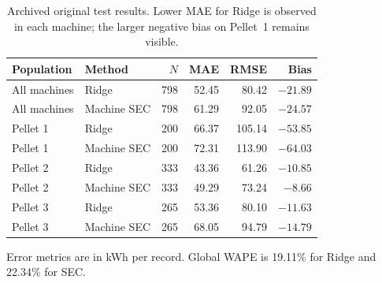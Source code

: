 \begin{table}[!htbp]\centering\small
\caption{Archived original test results. Lower MAE for Ridge is observed in each machine; the larger negative bias on Pellet~1 remains visible.}\label{tab:test}
\begin{tabular}{@{}llrrrr@{}}\toprule
Population & Method & $N$ & MAE & RMSE & Bias\\\midrule
All machines & Ridge & 798 & 52.45 & 80.42 & $-21.89$\\
All machines & Machine SEC & 798 & 61.29 & 92.05 & $-24.57$\\\addlinespace
Pellet 1 & Ridge & 200 & 66.37 & 105.14 & $-53.85$\\
Pellet 1 & Machine SEC & 200 & 72.31 & 113.90 & $-64.03$\\
Pellet 2 & Ridge & 333 & 43.36 & 61.26 & $-10.85$\\
Pellet 2 & Machine SEC & 333 & 49.29 & 73.24 & $-8.66$\\
Pellet 3 & Ridge & 265 & 53.36 & 80.10 & $-11.63$\\
Pellet 3 & Machine SEC & 265 & 68.05 & 94.79 & $-14.79$\\\bottomrule
\end{tabular}\par\vspace{4pt}\footnotesize Error metrics are in kWh per record. Global WAPE is 19.11\% for Ridge and 22.34\% for SEC.
\end{table}
